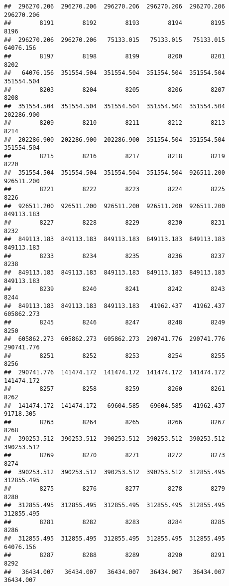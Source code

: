 \documentclass[
]{book}
\begin{document}
\begin{verbatim}
##  296270.206  296270.206  296270.206  296270.206  296270.206  296270.206 
##        8191        8192        8193        8194        8195        8196 
##  296270.206  296270.206   75133.015   75133.015   75133.015   64076.156 
##        8197        8198        8199        8200        8201        8202 
##   64076.156  351554.504  351554.504  351554.504  351554.504  351554.504 
##        8203        8204        8205        8206        8207        8208 
##  351554.504  351554.504  351554.504  351554.504  351554.504  202286.900 
##        8209        8210        8211        8212        8213        8214 
##  202286.900  202286.900  202286.900  351554.504  351554.504  351554.504 
##        8215        8216        8217        8218        8219        8220 
##  351554.504  351554.504  351554.504  351554.504  926511.200  926511.200 
##        8221        8222        8223        8224        8225        8226 
##  926511.200  926511.200  926511.200  926511.200  926511.200  849113.183 
##        8227        8228        8229        8230        8231        8232 
##  849113.183  849113.183  849113.183  849113.183  849113.183  849113.183 
##        8233        8234        8235        8236        8237        8238 
##  849113.183  849113.183  849113.183  849113.183  849113.183  849113.183 
##        8239        8240        8241        8242        8243        8244 
##  849113.183  849113.183  849113.183   41962.437   41962.437  605862.273 
##        8245        8246        8247        8248        8249        8250 
##  605862.273  605862.273  605862.273  290741.776  290741.776  290741.776 
##        8251        8252        8253        8254        8255        8256 
##  290741.776  141474.172  141474.172  141474.172  141474.172  141474.172 
##        8257        8258        8259        8260        8261        8262 
##  141474.172  141474.172   69604.585   69604.585   41962.437   91718.305 
##        8263        8264        8265        8266        8267        8268 
##  390253.512  390253.512  390253.512  390253.512  390253.512  390253.512 
##        8269        8270        8271        8272        8273        8274 
##  390253.512  390253.512  390253.512  390253.512  312855.495  312855.495 
##        8275        8276        8277        8278        8279        8280 
##  312855.495  312855.495  312855.495  312855.495  312855.495  312855.495 
##        8281        8282        8283        8284        8285        8286 
##  312855.495  312855.495  312855.495  312855.495  312855.495   64076.156 
##        8287        8288        8289        8290        8291        8292 
##   36434.007   36434.007   36434.007   36434.007   36434.007   36434.007 

\end{verbatim}
\end{document}
